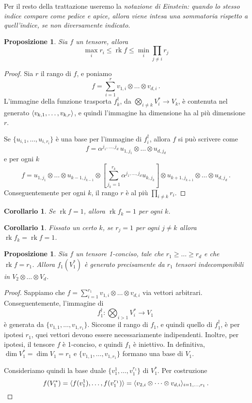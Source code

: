 \documentclass[a4paper, 11pt]{article}
\theoremstyle{definition}
\theoremstyle{plain}
\newtheorem{Prop}[Def]{Proposizione}
\newtheorem{Cor}[Def]{Corollario}
\DeclarePairedDelimiter{\ang}{\langle}{\rangle}
\DeclareMathOperator{\rk}{rk}
\begin{document}
Per il resto della trattazione useremo la \emph{notazione di Einstein: quando lo stesso indice compare come pedice e apice, allora viene intesa una sommatoria rispetto a quell'indice, se non diversamente indicato}.
\begin{Prop}
	Sia $f$ un tensore, allora 
	\[
		\max_i r_i \le \rk f \le \min_i \prod_{j \neq i} r_j
	\]
\end{Prop}
\begin{proof}
	Sia $r$ il rango di $f$, e poniamo 
	\[
		f = \sum_{i=1}^r v_{1,i}\otimes\dots\otimes v_{d,i}\,.
	\]
	L'immagine della funzione trasporta $f_k^\dagger$, da $\bigotimes_{i \neq k}V_i^\ast \to V_k$, è contenuta nel generato $\ang{v_{k,1}, \dots, v_{k,r}}$, e quindi l'immagine ha dimensione ha al più dimensione $r$.
	
	Se $\{u_{i,1}, \dots, u_{i,r_i}\}$ è una base per l'immagine di $f_i^\dagger$, allora $f$ si può scrivere come
	\[
		f = \alpha^{j_1, \dots, j_d}\,u_{1,j_1}\otimes \dots \otimes u_{d,j_d}
	\]
	e per ogni $k$ 
	\[
		f = u_{1,j_1}\otimes \dots \otimes u_{k-1, j_{k-1}}\otimes \left[\sum_{j_k=1}^{r_k}\alpha^{j_1,\dots, j_d}u_{k,j_k}\right]\otimes u_{k+1, j_{k+1}}\otimes \dots \otimes u_{d,j_d}\,.
	\]
	Conseguentemente per ogni $k$, il rango $r$ è al più $\prod_{i \neq k}r_i$.
\end{proof}
\begin{Cor}
	Se $\rk f = 1$, allora $\rk f_k = 1$ per ogni $k$.
\end{Cor}
\begin{Cor}
	Fissato un certo $k$, se $r_j = 1$ per ogni $j \neq k$ allora $\rk f_k = \rk f = 1$.
\end{Cor}
\begin{Prop}
	Sia $f$ un tensore 1-conciso, tale che $r_1 \ge \dots \ge r_d$ e che $\rk f = r_1$. Allora $f_1(V_1^*)$ è generato precisamente da $r_1$ tensori indecomponibili in $V_2 \otimes \dots \otimes V_d$.
\end{Prop}
\begin{proof}
	Sappiamo che $f = \sum_{i =1}^{r_1}v_{1,i}\otimes\dots\otimes v_{d,i}$ via vettori arbitrari. Conseguentemente, l'immagine di
	\[
		f_1^\dagger \colon \bigotimes_{i > 1} V_i^\ast \to V_1\,
	\]
	è generata da $\{v_{1,1}, \dots, v_{1,r_1}\}$. Siccome il rango di $f_1$, e quindi quello di $f_1^\dagger$, è per ipotesi $r_1$, quei vettori devono essere necessariamente indipendenti. Inoltre, per ipotesi, il tensore $f$ è 1-conciso, e quindi $f_1$ è iniettivo. In definitiva, $\dim V_1^* = \dim V_1 = r_1$ e $\{v_{1,1}, \dots, v_{1,r_1}\}$ formano una base di $V_1$. 
	
	Consideriamo quindi la base duale $\{v_1^1, \dots, v_1^{r_1}\}$ di $V_1^*$. Per costruzione
	\[
		f(V_1^*) = \ang{f(v_1^1), \dots, f(v_1^{r_1})} = \ang{v_{2,i}\otimes\dots\otimes v_{d,i}}_{i = 1,\dots, r_1}\,. \qedhere
	\]
\end{proof}
\end{document}
